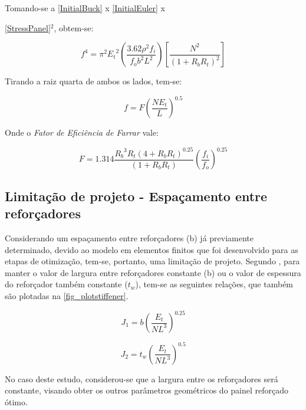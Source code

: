Tomando-se a \autoref{InitialBuck} x \autoref{InitialEuler} x {\autoref{StressPanel}$^2$, obtem-se:

\begin{equation} \label{StressPanel2}
f^4 = \pi^2{E_t}^2(\frac{3.62{\rho}^2f_i}{f_ob^2L^2})[\dfrac{N^2}{(1+R_bR_t)^2}]
\end{equation}

Tirando a raiz quarta de ambos os lados, tem-se:

\begin{equation} \label{StressPanel3}
f = F(\dfrac{NE_t}{L})^{0.5}
\end{equation}

Onde o \emph{Fator de Eficiência de Farrar} vale:

\begin{equation} \label{Farrar_Efficiency}
F = 1.314{\dfrac{{R_b}^3R_t(4+R_bR_t)^{0.25}}{(1+R_bR_t)}}({\frac{f_i}{f_o}})^{0.25}
\end{equation}

\subsection{Limitação de projeto - Espaçamento entre reforçadores}
Considerando um espaçamento entre reforçadores (b) já previamente determinado, devido ao modelo em elementos finitos que foi desenvolvido para as etapas de otimização, tem-se, portanto, uma limitação de projeto. Segundo \cite{niu1997airframe}, para manter o valor de largura entre reforçadores constante (b) ou o valor de espessura do reforçador também constante ($t_w$), tem-se as seguintes relações, que também são plotadas na \autoref{fig_plotstiffener}.

\begin{equation} \label{Farrar_Efficiency_J1}
J_1 = b({\dfrac{E_t}{NL^3}})^{0.25}
\end{equation}

\begin{equation} \label{Farrar_Efficiency_J2}
J_2 = t_w({\dfrac{E_t}{NL^3}})^{0.5}
\end{equation}

No caso deste estudo, considerou-se que a largura entre os reforçadores será constante, visando obter os outros parâmetros geométricos do painel reforçado ótimo.

}
